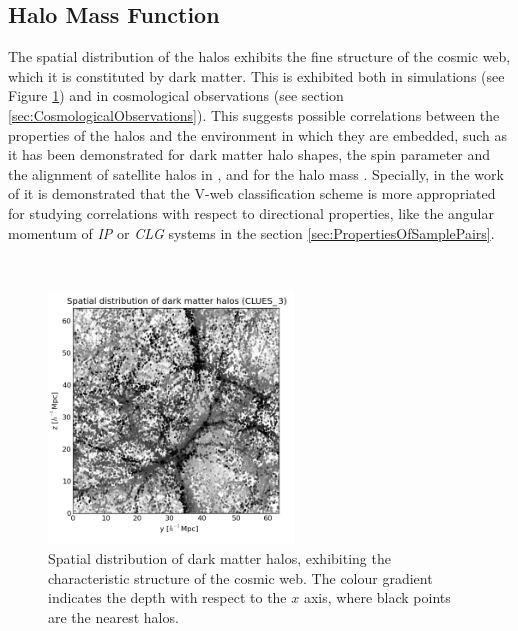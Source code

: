	\subsection{Halo Mass Function}
	\label{subsec:Halos_Properties}


The spatial distribution of the halos exhibits the fine structure of the 
cosmic web, which it is constituted by dark matter. This is exhibited both 
in simulations (see Figure \ref{fig:Halos_Web}) and in cosmological 
observations (see section \ref{sec:CosmologicalObservations}). This 
suggests possible correlations between the properties of the halos and the
environment in which they are embedded, such as it has been demonstrated 
for dark matter halo shapes, the spin parameter and the alignment of 
satellite halos in \cite{libeskind2013}, and for the halo mass 
\cite{lemson1999}. Specially, in the work of \cite{libeskind2013} it is
demonstrated that the V-web classification scheme is more appropriated for
studying correlations with respect to directional properties, like the 
angular momentum of \textit{IP} or \textit{CLG} systems in the section 
\ref{sec:PropertiesOfSamplePairs}.


\
\begin{figure}[htbp]
	\centering
	\includegraphics[width=0.58\textwidth]
	{./figures/3_nbody_simulations/Halos_Spatial_Distribution(CLUES_16953).png}

	\caption{\small{Spatial distribution of dark matter halos, exhibiting
	the	characteristic structure of the cosmic web. The colour gradient 
	indicates the depth with respect to the $x$ axis, where black points 
	are the nearest halos.}}
	
	\label{fig:Halos_Web}
\end{figure}



